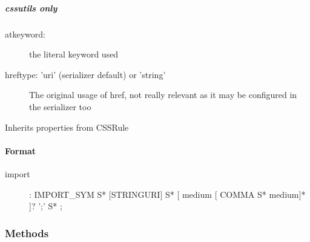 
\hypertarget{cssutils-only}{}
\subparagraph*{cssutils only}
\label{cssutils-only}
\begin{description}
\item[{atkeyword:}] \leavevmode 
the literal keyword used

\item[{hreftype: 'uri' (serializer default) or 'string'}] \leavevmode 
The original usage of href, not really relevant as it may be
configured in the serializer too

\end{description}

Inherits properties from CSSRule



\hypertarget{format}{}
\paragraph*{Format}
\label{format}
\begin{description}
\item[{import}] \leavevmode 
: IMPORT{\_}SYM S*
{[}STRING{\textbar}URI{]} S* {[} medium {[} COMMA S* medium{]}* {]}? ';' S*
;

\end{description}


  \subsubsection{Methods}

    \vspace{0.5ex}

